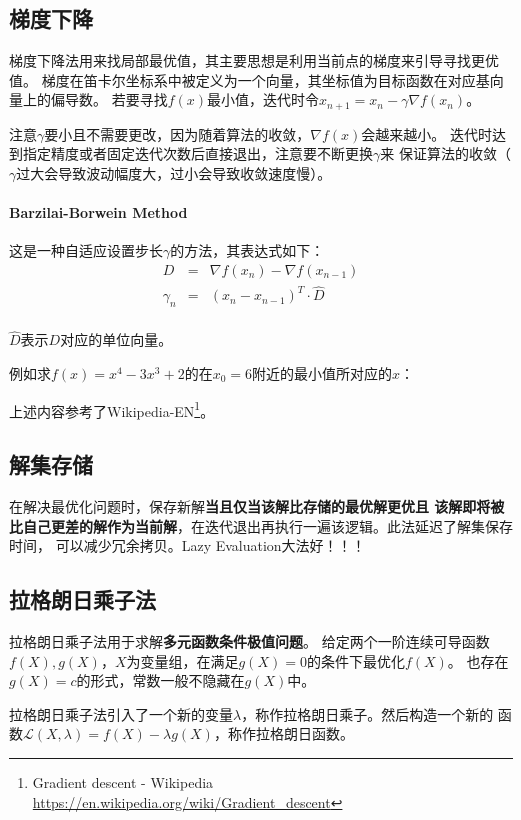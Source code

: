 \subsection{梯度下降}
梯度下降法用来找局部最优值，其主要思想是利用当前点的梯度来引导寻找更优值。
梯度在笛卡尔坐标系中被定义为一个向量，其坐标值为目标函数在对应基向量上的偏导数。
若要寻找$f(x)$最小值，迭代时令$x_{n+1}=x_n-\gamma \nabla f(x_n)$。

注意$\gamma$要小且不需要更改，因为随着算法的收敛，$\nabla f(x)$会越来越小。
迭代时达到指定精度或者固定迭代次数后直接退出，注意要不断更换$\gamma$来
保证算法的收敛（$\gamma$过大会导致波动幅度大，过小会导致收敛速度慢）。

\paragraph{Barzilai-Borwein Method}
这是一种自适应设置步长$\gamma$的方法，其表达式如下：
\begin{eqnarray*}
	D&=&\nabla f(x_n)-\nabla f(x_{n-1})\\
	\gamma_n&=&(x_n-x_{n-1})^T\cdot \hat{D}\\
\end{eqnarray*}

$\hat{D}$表示$D$对应的单位向量。

例如求$f(x)=x^4-3x^3+2$的在$x_0=6$附近的最小值所对应的$x$：



上述内容参考了Wikipedia-EN\footnote{
	Gradient descent - Wikipedia
	\url{https://en.wikipedia.org/wiki/Gradient\_descent}
}。
\subsection{解集存储}
在解决最优化问题时，保存新解{\bfseries 当且仅当该解比存储的最优解更优且
该解即将被比自己更差的解作为当前解}，在迭代退出再执行一遍该逻辑。此法延迟了解集保存时间，
可以减少冗余拷贝。Lazy Evaluation大法好！！！
\subsection{拉格朗日乘子法}
拉格朗日乘子法用于求解{\bfseries 多元函数条件极值问题}。
给定两个一阶连续可导函数$f(X),g(X)$，$X$为变量组，在满足$g(X)=0$的条件下最优化$f(X)$。
也存在$g(X)=c$的形式，常数一般不隐藏在$g(X)$中。

拉格朗日乘子法引入了一个新的变量$\lambda$，称作拉格朗日乘子。然后构造一个新的
函数$\mathcal{L}(X,\lambda)=f(X)-\lambda g(X)$，称作拉格朗日函数。

